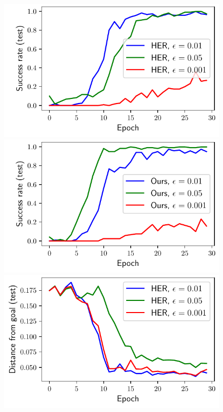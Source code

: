 %
\begin{figure}%
  \def\frac{0.24}
  \includegraphics[width=\frac\columnwidth]{media/res/ablate-ddpg-dqst-low_tresh_chosen-low_thresh_alt-ddpg/0.05-be0910cepoch-test/success_rate.pdf}%
  \includegraphics[width=\frac\columnwidth]{media/res/ablate-ddpg-dqst-low_tresh_chosen-low_thresh_alt-dqst/0.001-FetchPushPR-be467dfepoch-test/success_rate.pdf}%
  \includegraphics[width=\frac\columnwidth]{media/res/ablate-ddpg-dqst-low_tresh_chosen-low_thresh_alt-ddpg/0.05-be0910cepoch-test/ag_g_dist.pdf}%

\end{figure}
